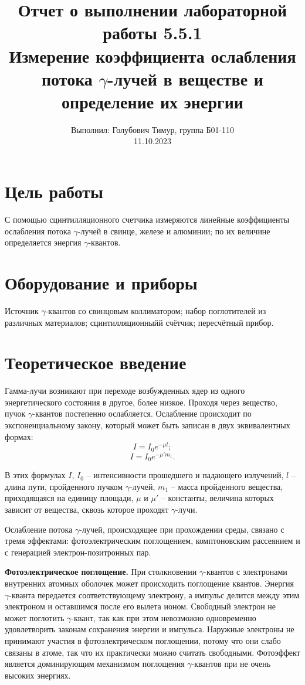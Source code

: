 \documentclass[12pt,a4paper]{article}
\author{\normalsize Выполнил: Голубович Тимур, группа Б01-110 \\
    	\normalsize 11.10.2023}
\date{}
\title{
    	\large Отчет о выполнении лабораторной работы 5.5.1 \\
    	\Large Измерение коэффициента ослабления потока $\gamma$-лучей в веществе и определение их энергии
     }
\begin{document}
    	\maketitle

    \section*{Цель работы}

    С помощью сцинтилляционного счетчика измеряются линейные коэффициенты ослабления потока $\gamma$-лучей в свинце, железе и алюминии; по их величине определяется энергия $\gamma$-квантов.


    \section*{Оборудование и приборы}

    Источник  $\gamma$-квантов со свинцовым коллиматором; набор поглотителей из различных материалов; сцинтилляционныйй счётчик; пересчётный прибор.
	
    \section*{Теоретическое введение}

    Гамма-лучи возникают при переходе возбужденных ядер из одного энергетического состояния в другое, более низкое. Проходя через вещество, пучок $\gamma$-квантов постепенно ослабляется. Ослабление происходит по экспоненциальному закону, который может быть записан в двух эквивалентных формах:
	\begin{equation}
		I = I_0 e^{-\mu l};
	\end{equation}
	\begin{equation}
		I = I_0 e^{-\mu' m_1}.
	\end{equation}

	В этих формулах $I$, $I_0$ -- интенсивности прошедшего и падающего излучений, $l$ -- длина пути, пройденного пучком $\gamma$-лучей, $m_1$ -- масса пройденного вещества, приходящаяся на единицу площади, $\mu$ и $\mu'$ -- константы, величина которых зависит от вещества, сквозь которое проходят $\gamma$-лучи.
	
	Ослабление потока $\gamma$-лучей, происходящее при прохождении среды, связано с тремя эффектами: фотоэлектрическим поглощением, комптоновским рассеянием и с генерацией электрон-позитронных пар.
	
	
	\textbf{Фотоэлектрическое поглощение.} При столкновении $\gamma$-квантов с электронами внутренних атомных оболочек может происходить поглощение квантов. Энергия $\gamma$-кванта передается соответствующему электрону, а импульс делится между этим электроном и оставшимся после его вылета ионом. Свободный электрон не может поглотить $\gamma$-квант, так как при этом невозможно одновременно удовлетворить законам сохранения энергии и импульса. Наружные электроны не принимают участия в фотоэлектрическом поглощении, потому что они слабо связаны в атоме, так что их практически можно считать свободными. Фотоэффект является доминирующим механизмом поглощения $\gamma$-квантов при не очень высоких энергиях.
	
\end{document}
